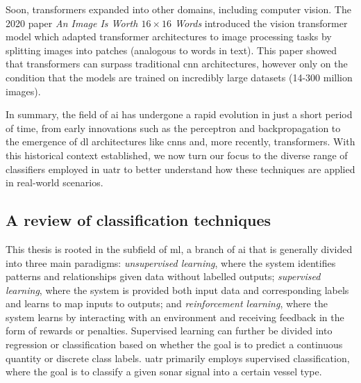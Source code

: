Soon, transformers expanded into other domains, including computer vision. The 2020 paper \textit{An Image Is Worth $16\times16$ Words} \cite{dosovitskiy_image_2020} introduced the vision transformer model which adapted transformer architectures to image processing tasks by splitting images into patches (analogous to words in text). This paper showed that transformers can surpass traditional \acrshort{cnn} architectures, however only on the condition that the models are trained on incredibly large datasets (14-300 million images).

In summary, the field of \acrlong{ai} has undergone a rapid evolution in just a short period of time, from early innovations such as the perceptron and backpropagation to the emergence of \acrlong{dl} architectures like \acrshort{cnn}s and, more recently, transformers. With this historical context established, we now turn our focus to the diverse range of classifiers employed in \acrshort{uatr} to better understand how these techniques are applied in real-world scenarios.

\subsection{A review of classification techniques}

This thesis is rooted in the subfield of \acrlong{ml}, a branch of \acrshort{ai} that is generally divided into three main paradigms: \textit{unsupervised learning}, where the system identifies patterns and relationships given data without labelled outputs; \textit{supervised learning}, where the system is provided both input data and corresponding labels and learns to map inputs to outputs; and \textit{reinforcement learning}, where the system learns by interacting with an environment and receiving feedback in the form of rewards or penalties. Supervised learning can further be divided into regression or classification based on whether the goal is to predict a continuous quantity or discrete class labels. \acrshort{uatr} primarily employs supervised classification, where the goal is to classify a given sonar signal into a certain vessel type.

